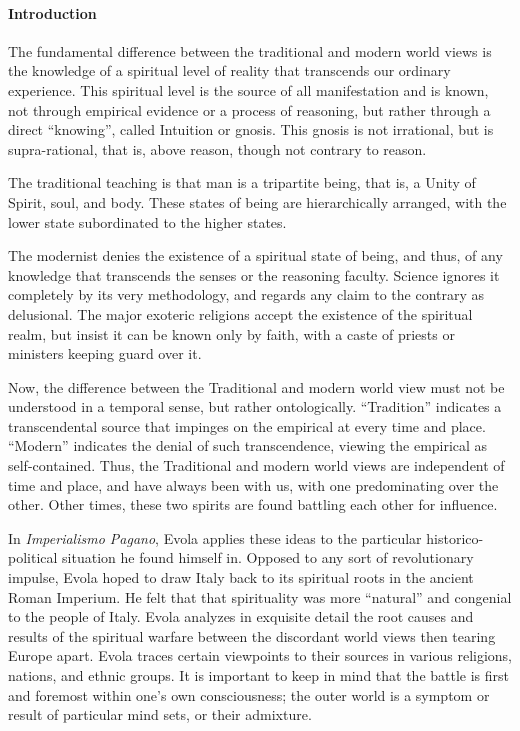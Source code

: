 \paragraph{Introduction} The fundamental difference between the traditional and modern world views is the knowledge of a spiritual level of reality that transcends our ordinary experience. This spiritual level is the source of all manifestation and is known, not through empirical evidence or a process of reasoning, but rather through a direct “knowing”, called Intuition or gnosis. This gnosis is not irrational, but is supra-rational, that is, above reason, though not contrary to reason.

The traditional teaching is that man is a tripartite being, that is, a Unity of Spirit, soul, and body. These states of being are hierarchically arranged, with the lower state subordinated to the higher states.

The modernist denies the existence of a spiritual state of being, and thus, of any knowledge that transcends the senses or the reasoning faculty. Science ignores it completely by its very methodology, and regards any claim to the contrary as delusional. The major exoteric religions accept the existence of the spiritual realm, but insist it can be known only by faith, with a caste of priests or ministers keeping guard over it.

Now, the difference between the Traditional and modern world view must not be understood in a temporal sense, but rather ontologically. “Tradition” indicates a transcendental source that impinges on the empirical at every time and place. “Modern” indicates the denial of such transcendence, viewing the empirical as self-contained. Thus, the Traditional and modern world views are independent of time and place, and have always been with us, with one predominating over the other. Other times, these two spirits are found battling each other for influence.

In \textit{Imperialismo Pagano}, Evola applies these ideas to the particular historico-political situation he found himself in. Opposed to any sort of revolutionary impulse, Evola hoped to draw Italy back to its spiritual roots in the ancient Roman Imperium. He felt that that spirituality was more “natural” and congenial to the people of Italy. Evola analyzes in exquisite detail the root causes and results of the spiritual warfare between the discordant world views then tearing Europe apart. Evola traces certain viewpoints to their sources in various religions, nations, and ethnic groups. It is important to keep in mind that the battle is first and foremost within one's own consciousness; the outer world is a symptom or result of particular mind sets, or their admixture.


